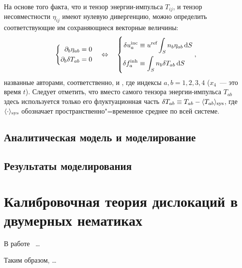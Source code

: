 \documentclass[a4paper, 14pt, titlepage]{extarticle}
\newcommand{\inc}{\textup{inc}}  %
\newcommand{\inh}{\textup{inh}}  %
\newcommand{\refer}{\textup{ref}}%
\newcommand{\sys}{\textup{sys}}  %
\begin{document}
  На основе того факта, что и тензор энергии-импульса $T_{ij}$, и тензор несовместности $\eta_{ij}$
  имеют нулевую дивергенцию, можно определить соответствующие им сохраняющиеся векторные величины:
  \[
    \left\{
      \begin{aligned}[c]
        \partial_b \eta_{ab} &= 0\\
        \partial_b \delta T_{ab} &= 0
      \end{aligned}
    \right.
    \quad \Leftrightarrow \quad
    \left\{
      \begin{aligned}[c]
        \delta u^\inc_a &\equiv u^\refer \int_S n_b \eta_{ab} \dif S \\
        \delta f^\inh_a &\equiv \int_S n_b \delta T_{ab} \dif S
      \end{aligned}
    \right. ,
  \]
  названные авторами, соответственно,  и , где индексы $a,b = 1,2,3,4$ ($x_4$~--- это время $t$). Следует отметить, что вместо самого
  тензора энергии-импульса $T_{ab}$ здесь используется только его флуктуационная часть
  $\delta T_{ab} \equiv T_{ab} - \langle T_{ab} \rangle_\sys$, где $\langle \cdot \rangle_\sys$
  обозначает пространственно"=временное среднее по всей системе.


  \subsection{Аналитическая модель и моделирование}


  \subsection{Результаты моделирования}


  \section{Калибровочная теория дислокаций в двумерных нематиках}

  В работе~\cite{liu-nematic} \dots


  Таким образом, \dots

  \PrintBibliography
\end{document}

